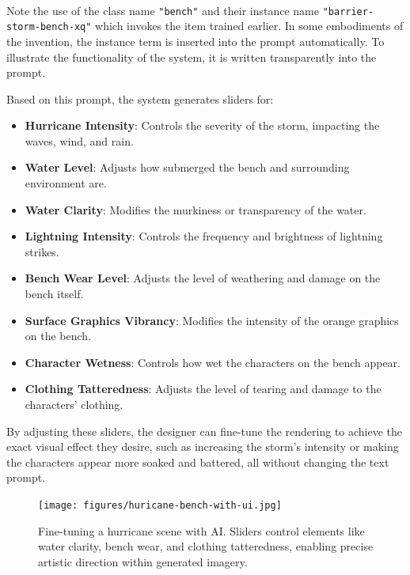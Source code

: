 \documentclass[12pt]{article}
\begin{document}
\paragraph{}
Note the use of the class name \texttt{"bench"} and their instance name \texttt{"barrier-storm-bench-xq"} which invokes the item trained earlier. In some embodiments of the invention, the instance term is inserted into the prompt automatically. To illustrate the functionality of the system, it is written transparently into the prompt.

Based on this prompt, the system generates sliders for:

\begin{itemize}
    \item \textbf{Hurricane Intensity}: Controls the severity of the storm, impacting the waves, wind, and rain.
    \item \textbf{Water Level}: Adjusts how submerged the bench and surrounding environment are.
    \item \textbf{Water Clarity}: Modifies the murkiness or transparency of the water.
    \item \textbf{Lightning Intensity}: Controls the frequency and brightness of lightning strikes.
    \item \textbf{Bench Wear Level}: Adjusts the level of weathering and damage on the bench itself.
    \item \textbf{Surface Graphics Vibrancy}: Modifies the intensity of the orange graphics on the bench.
    \item \textbf{Character Wetness}: Controls how wet the characters on the bench appear.
    \item \textbf{Clothing Tatteredness}: Adjusts the level of tearing and damage to the characters' clothing.
\end{itemize}

By adjusting these sliders, the designer can fine-tune the rendering to achieve the exact visual effect they desire, such as increasing the storm's intensity or making the characters appear more soaked and battered, all without changing the text prompt.

\begin{figure}[H]
    \centering
    \texttt{[image: figures/huricane-bench-with-ui.jpg]}
    \caption{Fine-tuning a hurricane scene with AI. Sliders control elements like water clarity, bench wear, and clothing tatteredness, enabling precise artistic direction within generated imagery.}
    \label{fig:modular-ui-texture-style}
\end{figure}
\end{document}
